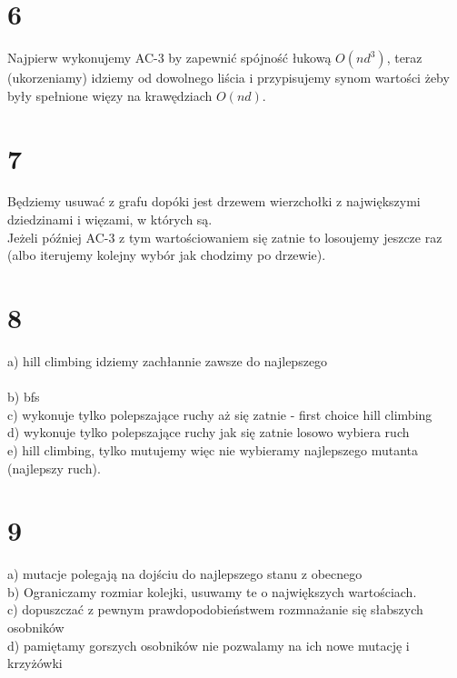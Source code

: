 \documentclass{article}
\begin{document}
\section{6}
Najpierw wykonujemy AC-3 by zapewnić spójność łukową $O(nd^3)$, teraz (ukorzeniamy) idziemy od dowolnego liścia i przypisujemy synom wartości żeby były spełnione więzy na krawędziach $O(nd)$.

\section{7}
Będziemy usuwać z grafu dopóki jest drzewem wierzchołki z największymi dziedzinami i więzami, w których są.\\
Jeżeli później AC-3 z tym wartościowaniem się zatnie to losoujemy jeszcze raz (albo iterujemy kolejny wybór jak chodzimy po drzewie).
\section{8}
a) \quad hill climbing idziemy zachłannie zawsze do najlepszego\\\\
b) \quad bfs\\
c) \quad wykonuje tylko polepszające ruchy aż się zatnie - first choice hill climbing\\
d) \quad wykonuje tylko polepszające ruchy jak się zatnie losowo wybiera ruch\\
e) \quad hill climbing, tylko mutujemy więc nie wybieramy najlepszego mutanta (najlepszy ruch).\\

\section{9}
a) \quad mutacje polegają na dojściu do najlepszego stanu z obecnego\\
b) \quad Ograniczamy rozmiar kolejki, usuwamy te o największych wartościach.\\
c) \quad dopuszczać z pewnym prawdopodobieństwem rozmnażanie się słabszych osobników\\
d) \quad pamiętamy gorszych osobników nie pozwalamy na ich nowe mutację i krzyżówki\\
\end{document}
